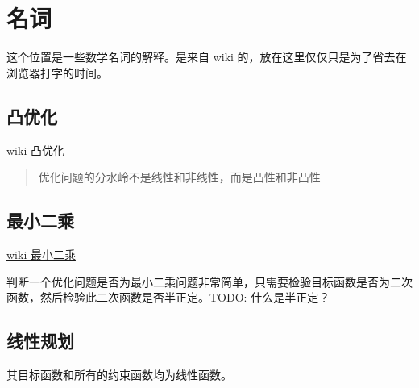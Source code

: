 \documentclass[article]{article}
\begin{document}
\section{名词}
这个位置是一些数学名词的解释。是来自 wiki 的，放在这里仅仅只是为了省去在浏览器打字的时间。
\subsection{凸优化}
\href{https://zh.wikipedia.org/wiki/%E5%87%B8%E5%84%AA%E5%8C%96}{wiki 凸优化} 
\begin{quotation} %
    优化问题的分水岭不是线性和非线性，而是凸性和非凸性
\end{quotation}
    
\subsection{最小二乘}
\href{https://zh.wikipedia.org/wiki/%E6%9C%80%E5%B0%8F%E4%BA%8C%E4%B9%98%E6%B3%95}{wiki 最小二乘}

判断一个优化问题是否为最小二乘问题非常简单，只需要检验目标函数是否为二次函数，然后检验此二次函数是否半正定。TODO: 什么是半正定？

\subsection{线性规划}
其目标函数和所有的约束函数均为线性函数。
\end{document}
